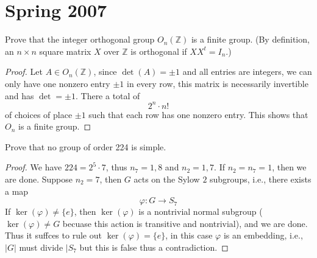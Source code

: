 \documentclass[openany]{book}
\newcommand{\Z}{\mathbb{Z}}
\begin{document}



\chapter{Spring 2007}



\begin{prob}
    Prove that the integer orthogonal group \(O_n(\mathbb{Z})\) is a finite group. (By definition, an \(n \times n\) square matrix \(X\) over \(\mathbb{Z}\) is orthogonal if \(XX^t = I_n\).)
\end{prob}
\begin{proof}
    Let $A\in O_n(\Z)$, since $\det(A)=\pm 1$ and all entries are integers, we can only have one nonzero entry $\pm 1$ in every row, this matrix is necessarily invertible and has $\det=\pm 1$. There a total of 
    \begin{equation*}
        2^n\cdot n!
    \end{equation*}
    of choices of place $\pm1$ such that each row has one nonzero entry. This shows that $O_n$ is a finite group.
\end{proof}

\begin{prob}
    Prove that no group of order 224 is simple.
\end{prob}
\begin{proof}
    We have $224=2^5\cdot 7$, thus $n_7=1,8$ and $n_2=1,7$. If $n_2=n_7=1$, then we are done. Suppose $n_2=7$, then $G$ acts on the Sylow $2$ subgroups, i.e., there exists a map 
    \begin{equation*}
        \varphi: G\to S_7
    \end{equation*}
    If $\ker(\varphi)\neq \{e\}$, then $\ker(\varphi)$ is a nontrivial normal subgroup ($\ker(\varphi)\neq G$ becuase this action is transitive and nontrivial), and we are done.  Thus it suffces to rule out $\ker(\varphi)=\{e\}$, in this case $\varphi$ is an embedding, i.e., $|G|$ must divide $|S_7$ but this is false thus a contradiction. 
\end{proof}
\end{document}
